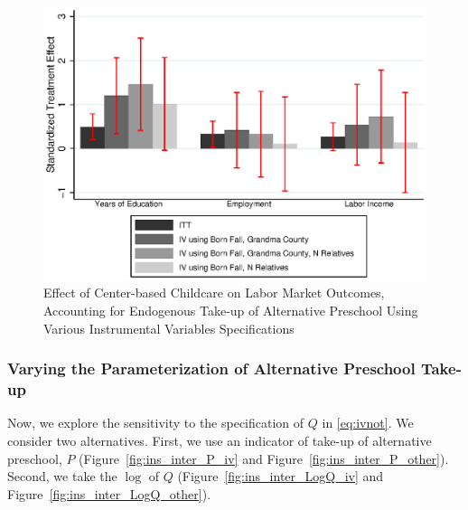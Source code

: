 \begin{figure}[H]
		\caption{Effect of Center-based Childcare on Labor Market Outcomes, Accounting for Endogenous Take-up of Alternative Preschool Using Various Instrumental Variables Specifications} \label{fig:inter_Q_other}
		\includegraphics[width=.7\columnwidth]{output/appendixplots/inter_Q_iv_other.eps}
\end{figure}

\subsubsection{Varying the Parameterization of Alternative Preschool Take-up}

\noindent Now, we explore the sensitivity to the specification of $Q$ in \eqref{eq:ivnot}. We consider two alternatives. First, we use an indicator of take-up of alternative preschool, $P$ (Figure~\ref{fig:ins_inter_P_iv} and Figure~\ref{fig:ins_inter_P_other}). Second, we take the $\log$ of $Q$ (Figure~\ref{fig:ins_inter_LogQ_iv} and Figure~\ref{fig:ins_inter_LogQ_other}).


